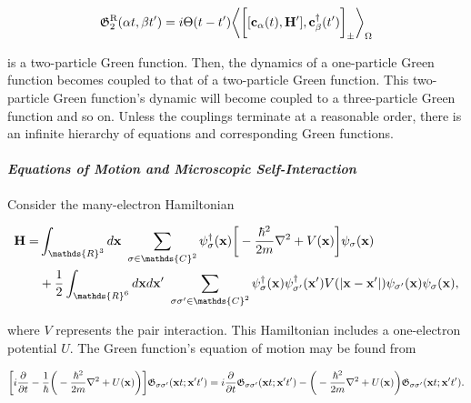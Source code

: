 \documentclass{homework}
\begin{document}
$$
\mathfrak{G}^{\textnormal{R}}_{2}(\alpha t, \beta t') = i \Theta(t-t') \bigg\langle\bigg[[{\bf c}_{\alpha}(t), {\bf H'}], {\bf c}_{\beta}^\dagger(t') \bigg]_{\pm}\bigg\rangle_{\Omega}
$$

is a two-particle Green function. Then, the dynamics of a one-particle Green function becomes coupled to that of a two-particle Green function. This two-particle Green function's dynamic will become coupled to a three-particle Green function and so on. Unless the couplings terminate at a reasonable order, there is an infinite hierarchy of equations and corresponding Green functions. \\

\paragraph{\textit{Equations of Motion and Microscopic Self-Interaction}}

Consider the many-electron Hamiltonian

\begin{equation}\begin{split}
    {\bf H} = &\int_{\mathds{R}^3} d{\bf x} \blanky \sum_{\sigma \in \mathds{C}^2} \psi^\dagger_{\sigma}({\bf x}) \bigg[-\frac{\hbar^2}{2m} \nabla^2 + V({\bf x})\bigg]\psi_{\sigma}({\bf x}) \\
    & + \frac{1}{2}  \int_{\mathds{R}^6} d{\bf x} d{\bf x}' \blanky \sum_{\sigma \sigma' \in \mathds{C}^2} \psi^\dagger_{\sigma}({\bf x}) \psi^\dagger_{\sigma'}({\bf x}') V(|{\bf x} - {\bf x}'|) \psi_{\sigma'}({\bf x}) \psi_{\sigma}({\bf x}),
\end{split}\end{equation}

where $V$ represents the pair interaction. This Hamiltonian includes a one-electron potential $U$. The Green function's equation of motion may be found from

\begin{equation}
    \begin{split}
        \bigg[i\frac{\partial}{\partial t} - \frac{1}{\hbar} \bigg(-\frac{\hbar^2}{2m} \nabla^2 + U({\bf x})\bigg)\bigg] \mathfrak{G}_{\sigma \sigma'}({\bf x} t; {\bf x}' t') = i\frac{\partial}{\partial t} \mathfrak{G}_{\sigma \sigma'}({\bf x} t; {\bf x}' t') - \bigg(-\frac{\hbar^2}{2m} \nabla^2 + U({\bf x})\bigg) \mathfrak{G}_{\sigma \sigma'}({\bf x} t; {\bf x}' t').
    \end{split}
\end{equation}
\end{document}
